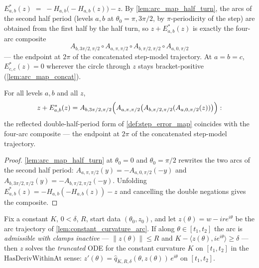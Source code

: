 \begin{definition}
  \label{def:step_error_map}
  $E^\ast_{a,b}(z)\;=\;-H_{a,b}\bigl(-H_{a,b}(z)\bigr)-z$. By
  \cref{lem:arc_map_half_turn}, the arcs of the second half period (levels $a,b$ at
  $\theta_0=\pi,3\pi/2$, by $\pi$-periodicity of the step) are obtained from the first
  half by the half turn, so $z+E^\ast_{a,b}(z)$ is exactly the four-arc composite
  \[
    A_{b,3\pi/2,\pi/2}\circ A_{a,\pi,\pi/2}\circ A_{b,\pi/2,\pi/2}\circ A_{a,0,\pi/2}
  \]
  — the endpoint at $2\pi$ of the concatenated step-model trajectory. At $a=b=c$,
  $E^\ast_{c,c}(z)=0$ wherever the circle through $z$ stays bracket-positive
  (\cref{lem:arc_map_concat}).
\end{definition}

\begin{lemma}
  \label{lem:step_error_map_four_arc}
  For all levels $a,b$ and all $z$,
  \[
    z+E^\ast_{a,b}(z)
    =A_{b,3\pi/2,\pi/2}\Bigl(A_{a,\pi,\pi/2}\bigl(A_{b,\pi/2,\pi/2}(A_{a,0,\pi/2}(z))
    \bigr)\Bigr) :
  \]
  the reflected double-half-period form of \cref{def:step_error_map} coincides with
  the four-arc composite — the endpoint at $2\pi$ of the concatenated step-model
  trajectory.
\end{lemma}

\begin{proof}
  \leanok
  \cref{lem:arc_map_half_turn} at $\theta_0=0$ and $\theta_0=\pi/2$ rewrites the two
  arcs of the second half period: $A_{a,\pi,\pi/2}(y)=-A_{a,0,\pi/2}(-y)$ and
  $A_{b,3\pi/2,\pi/2}(y)=-A_{b,\pi/2,\pi/2}(-y)$. Unfolding
  $E^\ast_{a,b}(z)=-H_{a,b}(-H_{a,b}(z))-z$ and cancelling the double negations gives
  the composite.
\end{proof}

\begin{lemma}
  \label{lem:constant_arc_solves_truncated}
  Fix a constant $K$, $0<\delta$, $R$, start data $(\theta_0,z_0)$, and let
  $z(\theta)=w-ire^{i\theta}$ be the arc trajectory of \cref{lem:constant_curvature_arc}.
  If along $\theta\in[t_1,t_2]$ the arc is \emph{admissible with clamps inactive} —
  $\|z(\theta)\|\le R$ and $K-\langle z(\theta),ie^{i\theta}\rangle\ge\delta$ — then $z$
  solves the \emph{truncated} ODE for the constant curvature $K$ on $[t_1,t_2]$ in the
  $\mathrm{HasDerivWithinAt}$ sense:
  $z'(\theta)=\hat q_{K,R,\delta}(\theta,z(\theta))\,e^{i\theta}$ on $[t_1,t_2]$.
\end{lemma}

